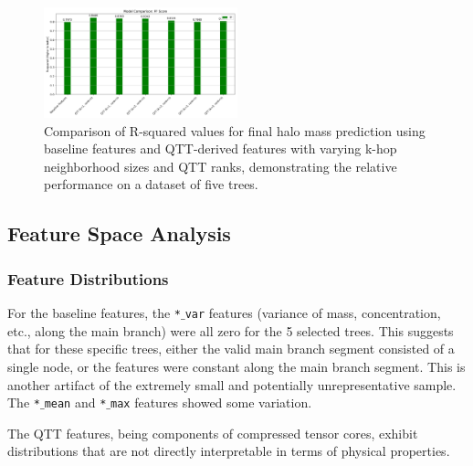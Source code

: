 \documentclass[twocolumn]{aastex631}
\begin{document}
\begin{figure}[h!]
    \centering
    \includegraphics[width=0.5\textwidth]{../input_files/plots/comparison_r2_24_20250524-175150.png}
    \caption{Comparison of R-squared values for final halo mass prediction using baseline features and QTT-derived features with varying k-hop neighborhood sizes and QTT ranks, demonstrating the relative performance on a dataset of five trees.
}
    \label{fig:comparison_r2}
\end{figure}

\subsection{Feature Space Analysis}

\subsubsection{Feature Distributions}
For the baseline features, the \texttt{*\ensuremath{\_}var} features (variance of mass, concentration, etc., along the main branch) were all zero for the 5 selected trees. This suggests that for these specific trees, either the valid main branch segment consisted of a single node, or the features were constant along the main branch segment. This is another artifact of the extremely small and potentially unrepresentative sample. The \texttt{*\ensuremath{\_}mean} and \texttt{*\ensuremath{\_}max} features showed some variation.

The QTT features, being components of compressed tensor cores, exhibit distributions that are not directly interpretable in terms of physical properties.
\end{document}
